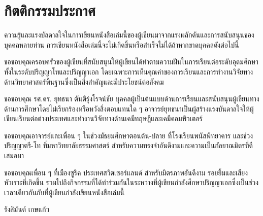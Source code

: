 

{

\chapter*{\centering กิตติกรรมประกาศ}

ความรู้และแรงบัลดาลใจในการเขียนหนังสือเล่มนี้ของผู้เขียนมาจากแรงผลักดันและการสนับสนุนของบุคคลหลายท่าน 
การเขียนหนังสือเล่มนี้จะไม่เกิดขึ้นหรือสำเร็จไม่ได้ถ้าหากขาดบุคคลดังต่อไปนี้

ขอขอบคุณครอบครัวของผู้เขียนที่สนับสนุนให้ผู้เขียนได้ทำตามความฝันในการเรียนต่อระดับอุดมศึกษา ทั้งในระดับปริญญาโทและปริญญาเอก 
โดยเฉพาะการเห็นคุณค่าของการเรียนและการทำงานวิจัยทางด้านวิทยาศาสตร์พื้นฐานซึ่งเป็นสิ่งสำคัญและมีประโยชน์ต่อสังคม

ขอขอบคุณ รศ.ดร. ยุทธนา ตันติรุ่งโรจน์ชัย บุคคลผู้เป็นต้นแบบด้านการเรียนและสนับสนุนผู้เขียนทางด้านการศึกษาโดยไม่เรียกร้องหรือหวังสิ่งตอบแทนใด ๆ 
อาจารย์ยุทธนาเป็นผู้สร้างแรงบันดาลใจให้ผู้เขียนเรียนต่อต่างประเทศและทำงานวิจัยทางด้านเคมีทฤษฎีและเคมีคอมพิวเตอร์

ขอขอบคุณอาจารย์และเพื่อน ๆ ในช่วงมัธยมศึกษาตอนต้น-ปลาย ที่โรงเรียนพนัสพิทยาคาร และช่วงปริญญาตรี-โท ที่มหาวิทยาลัยธรรมศาสตร์ 
สำหรับความทรงจำอันดีงามและความเป็นกัลยาณมิตรที่ดีเสมอมา

ขอขอบคุณเพื่อน ๆ ที่เมืองซูริค ประเทศสวิตเซอร์แลนด์ สำหรับมิตรภาพอันดีงาม รอยยิ้มและเสียงหัวเราะที่เกิดขึ้น 
รวมไปถึงกิจกรรมที่ได้ทำร่วมกันในระหว่างที่ผู้เขียนกำลังศึกษาปริญญาเอกซึ่งเป็นช่วงเวลาเดียวกันกับที่ผู้เขียนกำลังเขียนหนังสือเล่มนี้

\medskip

\begin{flushright}
รังสิมันต์ เกษแก้ว
\end{flushright}
}
